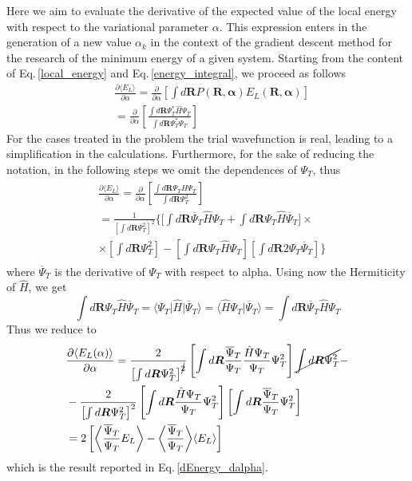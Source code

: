 Here we aim to evaluate the derivative of the expected value of the local energy with respect to the variational parameter $\alpha$. This expression enters in the generation of a new value $\alpha_k$ in the context of the gradient descent method for the research of the minimum energy of a given system. Starting from the content of Eq.\,\ref{local_energy} and Eq.\,\ref{energy_integral}, we proceed as follows
\begin{align*}
    &\frac{\partial\langle E_L \rangle}{\partial\alpha} = \frac{\partial}{\partial \alpha} \left[ \int d\bm{R} P(\bm{R}, \bm{\alpha}) E_L(\bm{R}, \bm{\alpha}) \right]  \\
    &= \frac{\partial}{\partial \alpha} \left[ \frac{\int d\bm{R} \Psi_T^* \hat{H} \Psi_T}{\int d\bm{R} \Psi_T^* \Psi_T} \right]
\end{align*}
For the cases treated in the problem the trial wavefunction is real, leading to a simplification in the calculations. Furthermore, for the sake of reducing the notation, in the following steps we omit the dependences of $\Psi_T$, thus
\begin{align*}
\begin{split}
    &\frac{\partial\langle E_L \rangle}{\partial\alpha} = \frac{\partial}{\partial \alpha} \left[ \frac{\int d\bm{R} \Psi_T \hat{H} \Psi_T}{\int d\bm{R} \Psi_T^2} \right] \\
    &=\frac{1}{ \left[\int d\bm{R} \Psi_T^2 \right]^2} \bigg\{ \bigg[ \int d\bm{R} \overline{\Psi}_T \hat{H} \Psi_T + \int d\bm{R} \Psi_T \hat{H}\overline{\Psi}_T \bigg] \times \\
    &\times \left[\int d\bm{R} \Psi_T^2 \right] - \left[ \int d\bm{R} \Psi_T \hat{H} \Psi_T \right] \left[ \int d\bm{R} 2 \Psi_T \overline{\Psi}_T \right] \bigg\}
    \end{split}
\end{align*}
where $\overline{\Psi}_T$ is the derivative of $\Psi_T$ with respect to alpha. Using now the Hermiticity of $\hat{H}$, we get
\begin{equation*}
    \int d\bm{R} \Psi_T \hat{H} \overline{\Psi}_T = \langle \Psi_T \vert \hat{H} \vert \overline{\Psi}_T \rangle = \langle \hat{H} \Psi_T \vert \overline{\Psi}_T \rangle = \int d\bm{R} \overline{\Psi}_T \hat{H} \Psi_T
\end{equation*}
Thus we reduce to
\begin{align*}
    &\frac{\partial\langle E_L(\alpha) \rangle}{\partial\alpha} = \frac{2}{ \left[\int d\bm{R} \Psi_T^2 \right]^{\cancel{2}} } \left[ \int d\bm{R} \frac{\overline{\Psi}_T}{\Psi_T} \frac{\hat{H} \Psi_T}{\Psi_T} \Psi_T^2 \right] \cancel{\int d\bm{R} \Psi_T^2} - \\
    &- \frac{2}{ \left[\int d\bm{R} \Psi_T^2 \right]^2} \left[ \int d\bm{R} \frac{\hat{H} \Psi_T}{\Psi_T} \Psi_T^2 \right] \left[ \int d\bm{R}  \frac{\overline{\Psi}_T}{\Psi_T} \Psi_T^2 \right] \\
    &= 2\left[ \bigg\langle \frac{\overline{\Psi}_T}{\Psi_T} E_L \bigg\rangle - \bigg\langle \frac{\overline{\Psi}_T}{\Psi_T} \bigg\rangle \langle E_L \rangle \right]
\end{align*}
which is the result reported in Eq.\,\ref{dEnergy_dalpha}.

\bigskip

